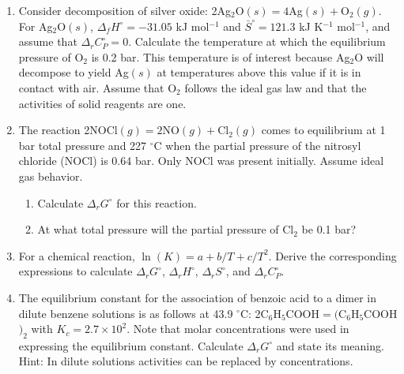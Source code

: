 \begin{enumerate}

\item Consider decomposition of silver oxide: 2Ag$_2$O$(s) = 4$Ag$(s) + $O$_2(g)$. For Ag$_2$O$(s)$, $\Delta_fH^\circ = -31.05$ kJ mol$^{-1}$ and $\bar{S}^\circ = 121.3$ kJ K$^{-1}$ mol$^{-1}$, and assume that $\Delta_rC_P^\circ = 0$. Calculate the temperature at which the equilibrium pressure of O$_2$ is 0.2 bar. This temperature is of interest because Ag$_2$O will decompose to yield Ag$(s)$ at temperatures above this value if it is in contact with air. Assume that O$_2$ follows the ideal gas law and that the activities of solid reagents are one.


\item The reaction 2NOCl$(g) = 2$NO$(g) + $Cl$_2(g)$ comes to equilibrium at 1 bar total pressure and 227 $^\circ$C when the partial pressure of the nitrosyl chloride (NOCl) is 0.64 bar. Only NOCl was present initially. Assume ideal gas behavior.

\begin{enumerate}
\item Calculate $\Delta_rG^\circ$ for this reaction.
\item At what total pressure will the partial pressure of Cl$_2$ be 0.1 bar?
\end{enumerate}


\item For a chemical reaction, $\ln(K) = a + b / T + c / T^2$. Derive the corresponding expressions to calculate $\Delta_rG^\circ$, $\Delta_rH^\circ$, $\Delta_rS^\circ$, and $\Delta_rC_P^\circ$.


\item The equilibrium constant for the association of benzoic acid to a dimer in dilute benzene solutions is as follows at 43.9 $^\circ$C: 2C$_6$H$_5$COOH$ = ($C$_6$H$_5$COOH$)_2$ with $K_c = 2.7 \times 10^2$. Note that molar concentrations were used in expressing the equilibrium constant. Calculate $\Delta_rG^\circ$ and state its meaning. Hint: In dilute solutions activities can be replaced by concentrations.


\end{enumerate}
